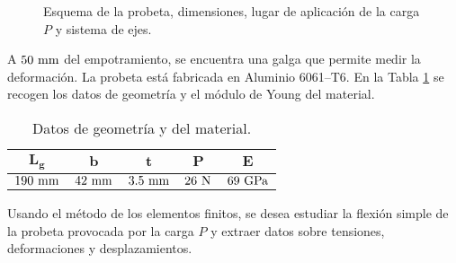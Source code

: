 \begin{figure}[h]
    \captionsetup{width=0.8\textwidth}
    \caption{Esquema de la probeta, dimensiones, lugar de aplicación de la carga $P$ y sistema de ejes.}
    \label{fig:planteamiento}
\end{figure}

\noindent
A $50 \ \milli\meter$ del empotramiento, se encuentra una galga que permite medir la deformación. La probeta está fabricada en Aluminio 6061--T6. En la Tabla \ref{tab:datos} se recogen los datos de geometría y el módulo de Young del material.

\begin{table}[h]
    \centering
    \begin{tabular}{ccccc}
        \toprule[0.50mm]
        $\mathbf{L_g}$ & $\mathbf{b}$ & $\mathbf{t}$ & $\mathbf{P}$ & $\mathbf{E}$ \\
        \midrule[0.25mm]
        $190 \ \milli\meter$ & $42 \ \milli\meter$ & $3.5 \ \milli\meter$ & $26 \ \newton$ & $69 \ \giga\pascal$ \\
        \bottomrule[0.50mm]
    \end{tabular}
    \caption{Datos de geometría y del material.}
    \label{tab:datos}
\end{table}

Usando el método de los elementos finitos, se desea estudiar la flexión simple de la probeta provocada por la carga $P$ y extraer datos sobre tensiones, deformaciones y desplazamientos.  